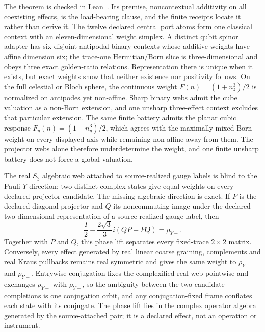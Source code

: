 \documentclass[11pt]{article}
\begin{document}
The theorem is checked in Lean~\cite{ophrepo}. Its premise, noncontextual
additivity on all coexisting effects, is the load-bearing clause, and the
finite receipts locate it rather than derive it. The twelve declared central
port atoms form one classical context with an eleven-dimensional weight
simplex. A distinct qubit spinor adapter has six disjoint antipodal binary
contexts whose additive weights have affine dimension six; the trace-one
Hermitian/Born slice is three-dimensional and obeys three exact golden-ratio
relations. Representation there is unique when it exists, but exact weights
show that neither existence nor positivity follows. On the full celestial or
Bloch sphere, the continuous weight \(F(n)=(1+n_z^3)/2\) is normalized on
antipodes yet non-affine. Sharp binary webs admit the cube valuation as a
non-Born extension, and one unsharp three-effect context excludes that
particular extension. The same finite battery admits the planar cubic
response \(F_y(n)=(1+n_y^3)/2\), which agrees with the maximally mixed Born
weight on every displayed axis while remaining non-affine away from them. The
projector webs alone therefore underdetermine the weight, and one finite
unsharp battery does not force a global valuation.

The real \(S_3\) algebraic web attached to source-realized gauge labels is
blind to the Pauli-\(Y\) direction: two distinct complex states give equal
weights on every declared projector candidate. The missing algebraic
direction is exact. If \(P\) is the declared diagonal projector and \(Q\) its
noncommuting image under the declared two-dimensional representation of a
source-realized gauge label, then
\[
 \frac{I}{2}-\frac{2\sqrt3}{3}i(QP-PQ)=\rho_{Y+}.
\]
Together with \(P\) and \(Q\), this phase lift separates every fixed-trace
\(2\times2\) matrix. Conversely, every effect generated by real linear
coarse graining, complements and real Kraus pullbacks remains real symmetric
and gives the same weight to \(\rho_{Y+}\) and \(\rho_{Y-}\). Entrywise
conjugation fixes the complexified real web pointwise and exchanges
\(\rho_{Y+}\) with \(\rho_{Y-}\), so the ambiguity between the two candidate
completions is one conjugation orbit, and any conjugation-fixed frame
conflates each state with its conjugate. The phase lift lies in the complex
operator algebra generated by the source-attached pair; it is a declared
effect, not an operation or instrument.
\end{document}
